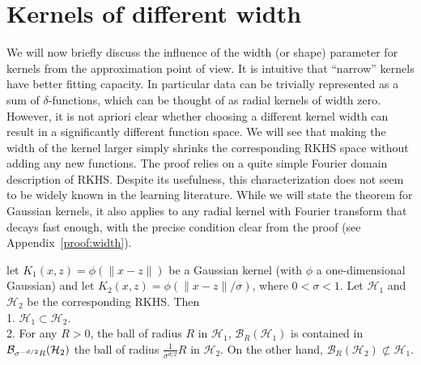 \documentclass[final,12pt]{colt2018}
\renewcommand{\H}{\mathcal{H}}
\newcommand{\Br}{\mathcal{B}_R}
\begin{document}
\section{Kernels of different width}\label{sec:width}
\vskip-5pt
We will now briefly discuss the influence of the width (or shape) parameter for kernels from the approximation point of view. 
 It is intuitive that ``narrow'' kernels have better fitting capacity. 
In particular  data can be trivially represented as a sum of $\delta$-functions, which can be thought of as radial kernels of width zero. 
However, it is not apriori clear whether choosing a different kernel width can result in a significantly different function space. We will see  that  making the width of the kernel larger simply shrinks the corresponding RKHS space without adding any new functions. The proof relies on a  quite simple Fourier domain description of RKHS. Despite its usefulness, this characterization   does not seem to be widely known in the learning literature. While we will state the theorem for Gaussian kernels, it also applies to any radial kernel with  Fourier transform that decays fast enough, with the precise condition clear from the proof (see Appendix~\ref{proof:width}).
\begin{theorem}\label{th:width}
 let $K_1(x,z) = \phi(\|x-z\|)$ be a Gaussian kernel  (with $\phi$ a one-dimensional Gaussian) and let 
 $K_2(x,z) = \phi (\|x - z\|/\sigma)$, where 
 $0<\sigma < 1$.  
Let $\H_1$ and $\H_2$ be the corresponding RKHS. Then\\
1.  $\H_1 \subset \H_2$. \\
2. For any $R>0$, the ball of radius $R$ in $\H_1$, $\Br(\H_1)$ is contained in ${\cal B}_{\sigma^{-d/2}R}(\H_2)$  the ball of radius $\frac{1}{\sigma^{d/2}}R$ in  $\H_2$.
On the other hand, $\Br(\H_2) \not\subset \H_1$.
\end{theorem}
\end{document}
